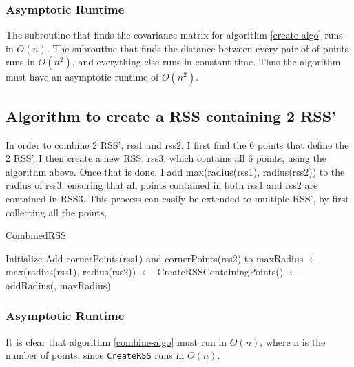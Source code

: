 \subsubsection{Asymptotic Runtime}
The subroutine that finds the covariance matrix for algorithm \ref{create-algo} runs in $O(n)$. The subroutine that finds the distance between every pair of of points runs in $O(n^2)$, and everything else runs in constant time. Thus the algorithm must have an asymptotic runtime of $O(n^2)$.

\subsection{Algorithm to create a RSS containing 2 RSS'}
In order to combine  2 RSS', rss1 and rss2, I first find the 6 points that define the 2 RSS'. I then create a new RSS, rss3, which contains all 6 points, using the algorithm above. Once that is done, I add  max(radius(rss1), radius(rss2)) to the radius of rss3, ensuring that all points contained in both rss1 and rss2 are contained in RSS3. This process can easily be extended to multiple RSS', by first collecting all the points, 

\begin{algorithm}[H]
  \caption{CombinedRSS}
  \label{combine-algo}
   
  \dontprintsemicolon
  Initialize \points \;
  Add cornerPoints(rss1) and cornerPoints(rss2) to \points \;
  maxRadius $\gets$ max(radius(rss1), radius(rss2)) \;
  \crss $\gets$ CreateRSSContainingPoints(\points) \;
  \crss $\gets$ addRadius(\crss, maxRadius) \;
  \return \crss
\end{algorithm}

\subsubsection{Asymptotic Runtime}
It is clear that algorithm \ref{combine-algo} must run in $O(n)$, where n is the number of points, since \texttt{CreateRSS} runs in $O(n)$. 

